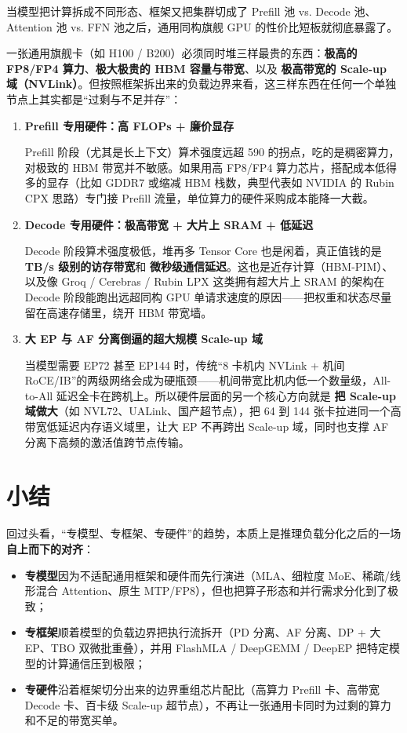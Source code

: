 \documentclass[11pt]{article}
\begin{document}
当模型把计算拆成不同形态、框架又把集群切成了 Prefill 池 vs. Decode 池、Attention 池 vs. FFN 池之后，通用同构旗舰 GPU 的性价比短板就彻底暴露了。

一张通用旗舰卡（如 H100 / B200）必须同时堆三样最贵的东西：\textbf{极高的 FP8/FP4 算力}、\textbf{极大极贵的 HBM 容量与带宽}、以及 \textbf{极高带宽的 Scale-up 域（NVLink）}。但按照框架拆出来的负载边界来看，这三样东西在任何一个单独节点上其实都是“过剩与不足并存”：

\begin{enumerate}
  \item \textbf{Prefill 专用硬件：高 FLOPs + 廉价显存}

  Prefill 阶段（尤其是长上下文）算术强度远超 590 的拐点，吃的是稠密算力，对极致的 HBM 带宽并不敏感。如果用高 FP8/FP4 算力芯片，搭配成本低得多的显存（比如 GDDR7 或缩减 HBM 栈数，典型代表如 NVIDIA 的 Rubin CPX 思路）专门接 Prefill 流量，单位算力的硬件采购成本能降一大截。

  \item \textbf{Decode 专用硬件：极高带宽 + 大片上 SRAM + 低延迟}

  Decode 阶段算术强度极低，堆再多 Tensor Core 也是闲着，真正值钱的是 \textbf{TB/s 级别的访存带宽}和 \textbf{微秒级通信延迟}。这也是近存计算（HBM-PIM）、以及像 Groq / Cerebras / Rubin LPX 这类拥有超大片上 SRAM 的架构在 Decode 阶段能跑出远超同构 GPU 单请求速度的原因——把权重和状态尽量留在高速存储里，绕开 HBM 带宽墙。

  \item \textbf{大 EP 与 AF 分离倒逼的超大规模 Scale-up 域}

  当模型需要 EP72 甚至 EP144 时，传统“8 卡机内 NVLink + 机间 RoCE/IB”的两级网络会成为硬瓶颈——机间带宽比机内低一个数量级，All-to-All 延迟全卡在跨机上。所以硬件层面的另一个核心方向就是 \textbf{把 Scale-up 域做大}（如 NVL72、UALink、国产超节点），把 64 到 144 张卡拉进同一个高带宽低延迟内存语义域里，让大 EP 不再跨出 Scale-up 域，同时也支撑 AF 分离下高频的激活值跨节点传输。
\end{enumerate}

\section{小结}

回过头看，“专模型、专框架、专硬件”的趋势，本质上是推理负载分化之后的一场\textbf{自上而下的对齐}：

\begin{itemize}
  \item \textbf{专模型}因为不适配通用框架和硬件而先行演进（MLA、细粒度 MoE、稀疏/线形混合 Attention、原生 MTP/FP8），但也把算子形态和并行需求分化到了极致；
  \item \textbf{专框架}顺着模型的负载边界把执行流拆开（PD 分离、AF 分离、DP + 大 EP、TBO 双微批重叠），并用 FlashMLA / DeepGEMM / DeepEP 把特定模型的计算通信压到极限；
  \item \textbf{专硬件}沿着框架切分出来的边界重组芯片配比（高算力 Prefill 卡、高带宽 Decode 卡、百卡级 Scale-up 超节点），不再让一张通用卡同时为过剩的算力和不足的带宽买单。
\end{itemize}
\end{document}
